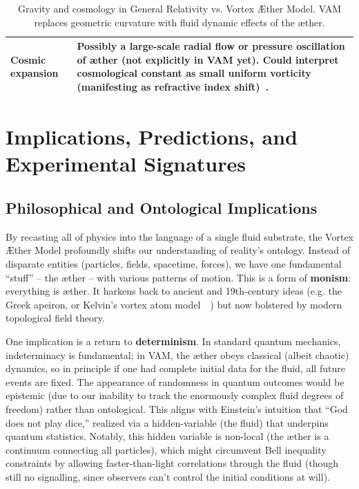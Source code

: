 \documentclass[preprint]{revtex4-2}
\begin{document}
\begin{table}[H]
\begin{tabular}{p{} | p{}}
            Cosmic expansion & Possibly a large-scale radial flow or pressure oscillation of æther (not explicitly in VAM yet). Could interpret cosmological constant as small uniform vorticity (manifesting as refractive index shift)~\cite{reference_231}. \\
            \hline
        \end{tabular}
        \caption{Gravity and cosmology in General Relativity vs. Vortex Æther Model.  VAM replaces geometric curvature with fluid dynamic effects of the æther.}
        \label{tab:GRcompare}
    \end{table}

    \newpage

\section{Implications, Predictions, and Experimental Signatures}
    \subsection{Philosophical and Ontological Implications}
    By recasting all of physics into the language of a single fluid substrate, the Vortex Æther Model profoundly shifts our understanding of reality's ontology. Instead of disparate entities (particles, fields, spacetime, forces), we have one fundamental “stuff” -- the æther -- with various patterns of motion. This is a form of \textbf{monism}: everything is æther. It harkens back to ancient and 19th-century ideas (e.g. the Greek apeiron, or Kelvin’s vortex atom model~\cite{reference_232}~\cite{reference_233}) but now bolstered by modern topological field theory.

    One implication is a return to \textbf{determinism}. In standard quantum mechanics, indeterminacy is fundamental; in VAM, the æther obeys classical (albeit chaotic) dynamics, so in principle if one had complete initial data for the fluid, all future events are fixed. The appearance of randomness in quantum outcomes would be epistemic (due to our inability to track the enormously complex fluid degrees of freedom) rather than ontological. This aligns with Einstein’s intuition that “God does not play dice,” realized via a hidden-variable (the fluid) that underpins quantum statistics. Notably, this hidden variable is non-local (the æther is a continuum connecting all particles), which might circumvent Bell inequality constraints by allowing faster-than-light correlations through the fluid (though still no signalling, since observers can’t control the initial conditions at will).
\end{document}
